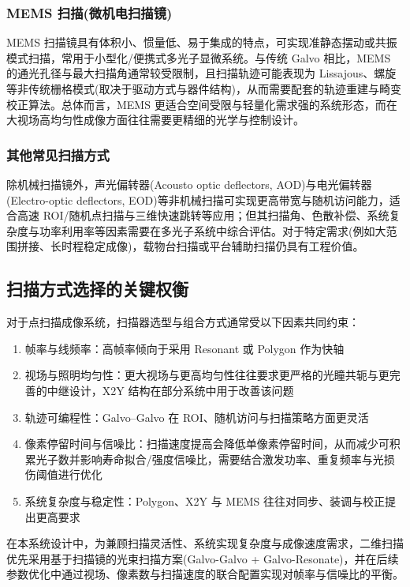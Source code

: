 \subsubsection{MEMS 扫描(微机电扫描镜)}
MEMS 扫描镜具有体积小、惯量低、易于集成的特点，可实现准静态摆动或共振模式扫描，常用于小型化/便携式多光子显微系统。与传统 Galvo 相比，MEMS 的通光孔径与最大扫描角通常较受限制，且扫描轨迹可能表现为 Lissajous、螺旋等非传统栅格模式(取决于驱动方式与器件结构)，从而需要配套的轨迹重建与畸变校正算法。总体而言，MEMS 更适合空间受限与轻量化需求强的系统形态，而在大视场高均匀性成像方面往往需要更精细的光学与控制设计。

\subsubsection{其他常见扫描方式}
除机械扫描镜外，声光偏转器(Acousto optic deflectors, AOD)与电光偏转器(Electro-optic deflectors, EOD)等非机械扫描可实现更高带宽与随机访问能力，适合高速 ROI/随机点扫描与三维快速跳转等应用；但其扫描角、色散补偿、系统复杂度与功率利用率等因素需要在多光子系统中综合评估。对于特定需求(例如大范围拼接、长时程稳定成像)，载物台扫描或平台辅助扫描仍具有工程价值。



\subsection{扫描方式选择的关键权衡}\label{2.3.3}
对于点扫描成像系统，扫描器选型与组合方式通常受以下因素共同约束：

\begin{enumerate}
    \item 帧率与线频率：高帧率倾向于采用 Resonant 或 Polygon 作为快轴
    \item 视场与照明均匀性：更大视场与更高均匀性往往要求更严格的光瞳共轭与更完善的中继设计，X2Y 结构在部分系统中用于改善该问题
    \item 轨迹可编程性：Galvo–Galvo 在 ROI、随机访问与扫描策略方面更灵活
    \item 像素停留时间与信噪比：扫描速度提高会降低单像素停留时间，从而减少可积累光子数并影响寿命拟合/强度信噪比，需要结合激发功率、重复频率与光损伤阈值进行优化
    \item 系统复杂度与稳定性：Polygon、X2Y 与 MEMS 往往对同步、装调与校正提出更高要求
\end{enumerate}

在本系统设计中，为兼顾扫描灵活性、系统实现复杂度与成像速度需求，二维扫描优先采用基于扫描镜的光束扫描方案(Galvo-Galvo + Galvo-Resonate)，并在后续参数优化中通过视场、像素数与扫描速度的联合配置实现对帧率与信噪比的平衡。



